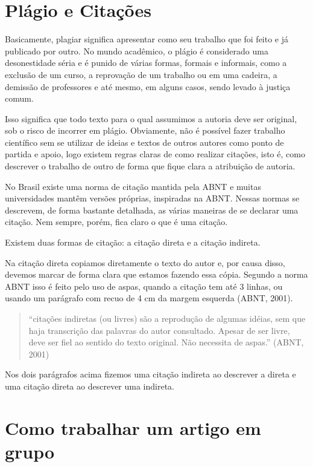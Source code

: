 \section{Plágio e Citações}

Basicamente, plagiar significa apresentar como seu trabalho que foi feito e já publicado por outro. No mundo acadêmico, o plágio é considerado uma desonestidade séria e é punido de várias formas, formais e informais, como a exclusão de um curso, a reprovação de um trabalho ou em uma cadeira, a demissão de professores e até mesmo, em alguns casos, sendo levado à justiça comum.

Isso significa que todo texto para o qual assumimos a autoria deve ser original, sob o risco de incorrer em plágio. Obviamente, não é possível fazer trabalho científico sem se utilizar de ideias e textos de outros autores como ponto de partida e apoio, logo existem regras claras de como realizar citações, isto é, como descrever o trabalho de outro de forma que fique clara a atribuição de autoria.

No Brasil existe uma norma de citação mantida pela ABNT e muitas universidades mantêm versões próprias, inspiradas na ABNT. Nessas normas se descrevem, de forma bastante detalhada, as várias maneiras de se declarar uma citação. Nem sempre, porém, fica claro o que é uma citação.

Existem duas formas de citação: a citação direta e a citação indireta. 

Na citação direta copiamos diretamente o texto do autor e, por causa disso, devemos marcar de forma clara que estamos fazendo essa cópia. Segundo a norma ABNT isso é feito pelo uso de aspas, quando a citação tem até 3 linhas, ou usando um parágrafo com recuo de 4 cm da margem esquerda (ABNT, 2001).

\begin{quote}
``citações indiretas (ou livres) são a reprodução de algumas idéias, sem que haja transcrição das palavras do autor consultado. Apesar de ser livre, deve ser fiel ao sentido do texto original. Não necessita de aspas.'' (ABNT, 2001)
\end{quote}

Nos dois parágrafos acima fizemos uma citação indireta ao descrever a direta e uma citação direta ao descrever uma indireta. 

\section{Como trabalhar um artigo em grupo}


